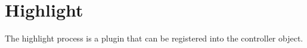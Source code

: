\section{Highlight}

The highlight process is a plugin that can be registered into the controller object.

